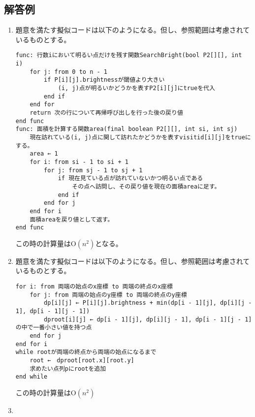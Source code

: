 \documentclass[dvipdfmx,titlepage, 11pt, a4paper]{jsarticle}%
\begin{document}
\newpage

\subsection{解答例}
\begin{enumerate}[(1)]
    \item 題意を満たす擬似コードは以下のようになる。但し、参照範囲は考慮されているものとする。
\begin{lstlisting}[frame = sigle, style = customText]
func: 行数iにおいて明るい点だけを残す関数SearchBright(bool P2[][], int i)
    for j: from 0 to n - 1
        if P[i][j].brightnessが閾値より大きい
            (i, j)点が明るいかどうかを表すP2[i][j]にtrueを代入
        end if
    end for
    return 次の行について再帰呼び出しを行った後の戻り値
end func
func: 面積を計算する関数area(final boolean P2[][], int si, int sj) 
    現在訪れている(i, j)点に関して訪れたかどうかを表すvisitid[i][j]をtrueにする。
    area ← 1
    for i: from si - 1 to si + 1
        for j: from sj - 1 to sj + 1
            if 現在見ている点が訪れていないかつ明るい点である
                その点へ訪問し、その戻り値を現在の面積areaに足す。
            end if
        end for j
    end for i
    面積areaを戻り値として返す。
end func
\end{lstlisting}
    この時の計算量は$\mathrm{O}(n^2)$となる。
    \item 題意を満たす擬似コードは以下のようになる。但し、参照範囲は考慮されているものとする。
\begin{lstlisting}[frame = single, style = customText]
for i: from 両端の始点のx座標 to 両端の終点のx座標
    for j: from 両端の始点のy座標 to 両端の終点のy座標
        dp[i][j] ← P[i][j].brightness + min(dp[i - 1][j], dp[i][j - 1], dp[i - 1][j - 1])
        dproot[i][j] ← dp[i - 1][j], dp[i][j - 1], dp[i - 1][j - 1]の中で一番小さい値を持つ点
    end for j
end for i
while rootが両端の終点から両端の始点になるまで
    root ←　dproot[root.x][root.y]
    求めたい点列pにrootを追加
end while
\end{lstlisting}
    この時の計算量は$\mathrm{O}(n^2)$
    \item 
\end{enumerate}
\newpage
\section{}%
\end{document}
